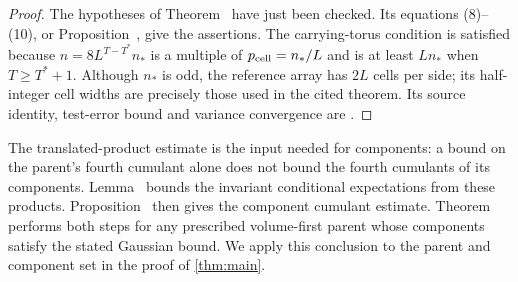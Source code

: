 \begin{proof}
The hypotheses of Theorem~
have just been checked. Its equations (8)--(10), or
Proposition~, give the assertions.
The carrying-torus condition is satisfied because
$n=8L^{T-T^*}n_*$ is a multiple of $p_{\rm cell}=n_*/L$
and is at least $Ln_*$ when $T\ge T^*+1$.
Although $n_*$ is odd, the reference array has $2L$ cells
per side; its half-integer cell widths are precisely those
used in the cited theorem. Its source identity, test-error
bound and variance convergence are \cite[Section~2.2, (19)--(20)]{VolumeTransfer}.
\end{proof}

The translated-product estimate is the input needed for
components: a bound on the parent's fourth cumulant alone
does not bound the fourth cumulants of its components.
Lemma~ bounds the invariant
conditional expectations from these products.
Proposition~ then gives the
component cumulant estimate. Theorem~
performs both steps for any prescribed volume-first parent
whose components satisfy the stated Gaussian bound.
We apply this conclusion to the parent and component set
in the proof of \cref{thm:main}.
